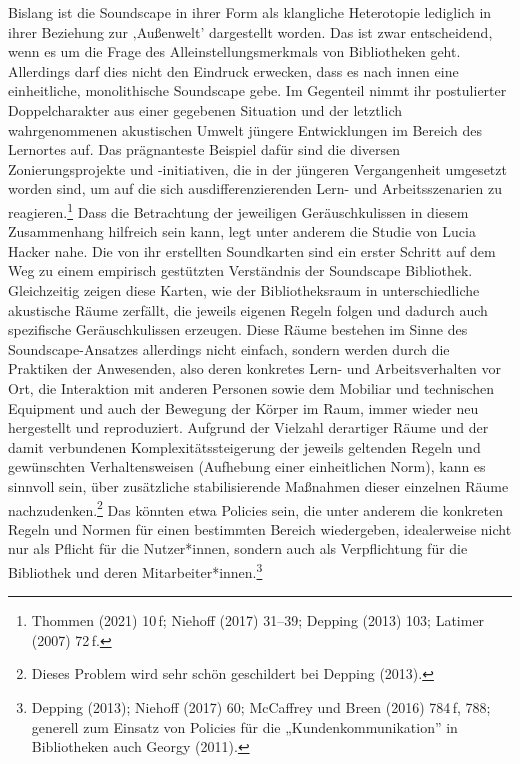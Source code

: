 \documentclass[a4paper,
fontsize=11pt,
oneside,
numbers=noperiodatend,
parskip=half-,
bibliography=totoc,
final
]{scrartcl}
\begin{document}
Bislang ist die Soundscape in ihrer Form als klangliche Heterotopie
lediglich in ihrer Beziehung zur ‚Außenwelt' dargestellt worden. Das ist
zwar entscheidend, wenn es um die Frage des Alleinstellungsmerkmals von
Bibliotheken geht. Allerdings darf dies nicht den Eindruck erwecken,
dass es nach innen eine einheitliche, monolithische Soundscape gebe. Im
Gegenteil nimmt ihr postulierter Doppelcharakter aus einer gegebenen
Situation und der letztlich wahrgenommenen akustischen Umwelt jüngere
Entwicklungen im Bereich des Lernortes auf. Das prägnanteste Beispiel
dafür sind die diversen Zonierungsprojekte und -initiativen, die in der
jüngeren Vergangenheit umgesetzt worden sind, um auf die sich
ausdifferenzierenden Lern- und Arbeitsszenarien zu reagieren.\footnote{Thommen
  (2021) 10\,f; Niehoff (2017) 31--39; Depping (2013) 103; Latimer
  (2007) 72\,f.} Dass die Betrachtung der jeweiligen Geräuschkulissen in
diesem Zusammenhang hilfreich sein kann, legt unter anderem die Studie
von Lucia Hacker nahe. Die von ihr erstellten Soundkarten sind ein
erster Schritt auf dem Weg zu einem empirisch gestützten Verständnis der
Soundscape Bibliothek. Gleichzeitig zeigen diese Karten, wie der
Bibliotheksraum in unterschiedliche akustische Räume zerfällt, die
jeweils eigenen Regeln folgen und dadurch auch spezifische
Geräuschkulissen erzeugen. Diese Räume bestehen im Sinne des
Soundscape-Ansatzes allerdings nicht einfach, sondern werden durch die
Praktiken der Anwesenden, also deren konkretes Lern- und
Arbeitsverhalten vor Ort, die Interaktion mit anderen Personen sowie dem
Mobiliar und technischen Equipment und auch der Bewegung der Körper im
Raum, immer wieder neu hergestellt und reproduziert. Aufgrund der
Vielzahl derartiger Räume und der damit verbundenen
Komplexitätssteigerung der jeweils geltenden Regeln und gewünschten
Verhaltensweisen (Aufhebung einer einheitlichen Norm), kann es sinnvoll
sein, über zusätzliche stabilisierende Maßnahmen dieser einzelnen Räume
nachzudenken.\footnote{Dieses Problem wird sehr schön geschildert bei
  Depping (2013).} Das könnten etwa Policies sein, die unter anderem die
konkreten Regeln und Normen für einen bestimmten Bereich wiedergeben,
idealerweise nicht nur als Pflicht für die Nutzer*innen, sondern auch
als Verpflichtung für die Bibliothek und deren
Mitarbeiter*innen.\footnote{Depping (2013); Niehoff (2017) 60; McCaffrey
  und Breen (2016) 784\,f, 788; generell zum Einsatz von Policies für
  die „Kundenkommunikation'' in Bibliotheken auch Georgy (2011).}
\end{document}
